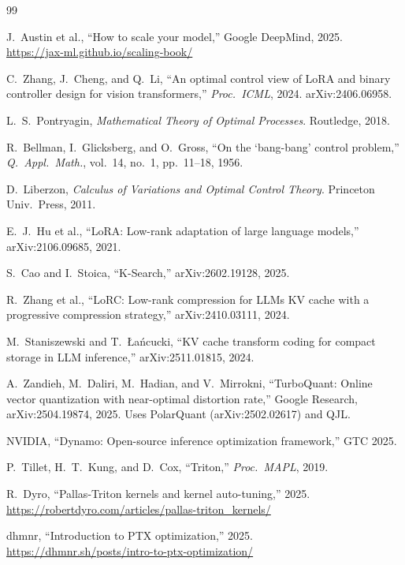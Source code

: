\documentclass[11pt]{article}
\begin{document}
\begin{thebibliography}{99}

J.~Austin et al., ``How to scale your model,'' Google DeepMind, 2025. \url{https://jax-ml.github.io/scaling-book/}

C.~Zhang, J.~Cheng, and Q.~Li, ``An optimal control view of LoRA and binary controller design for vision transformers,'' \emph{Proc.\ ICML}, 2024. arXiv:2406.06958.

L.~S.~Pontryagin, \emph{Mathematical Theory of Optimal Processes}. Routledge, 2018.

R.~Bellman, I.~Glicksberg, and O.~Gross, ``On the `bang-bang' control problem,'' \emph{Q.\ Appl.\ Math.}, vol.~14, no.~1, pp.~11--18, 1956.

D.~Liberzon, \emph{Calculus of Variations and Optimal Control Theory}. Princeton Univ.\ Press, 2011.

E.~J.~Hu et al., ``LoRA: Low-rank adaptation of large language models,'' arXiv:2106.09685, 2021.

S.~Cao and I.~Stoica, ``K-Search,'' arXiv:2602.19128, 2025.

R.~Zhang et al., ``LoRC: Low-rank compression for LLMs KV cache with a progressive compression strategy,'' arXiv:2410.03111, 2024.

M.~Staniszewski and T.~\L{}a\'{n}cucki, ``KV cache transform coding for compact storage in LLM inference,'' arXiv:2511.01815, 2024.

A.~Zandieh, M.~Daliri, M.~Hadian, and V.~Mirrokni, ``TurboQuant: Online vector quantization with near-optimal distortion rate,'' Google Research, arXiv:2504.19874, 2025. Uses PolarQuant (arXiv:2502.02617) and QJL.

NVIDIA, ``Dynamo: Open-source inference optimization framework,'' GTC 2025.

P.~Tillet, H.~T.~Kung, and D.~Cox, ``Triton,'' \emph{Proc.\ MAPL}, 2019.

R.~Dyro, ``Pallas-Triton kernels and kernel auto-tuning,'' 2025. \url{https://robertdyro.com/articles/pallas-triton_kernels/}

dhmnr, ``Introduction to PTX optimization,'' 2025. \url{https://dhmnr.sh/posts/intro-to-ptx-optimization/}


\end{thebibliography}
\end{document}
